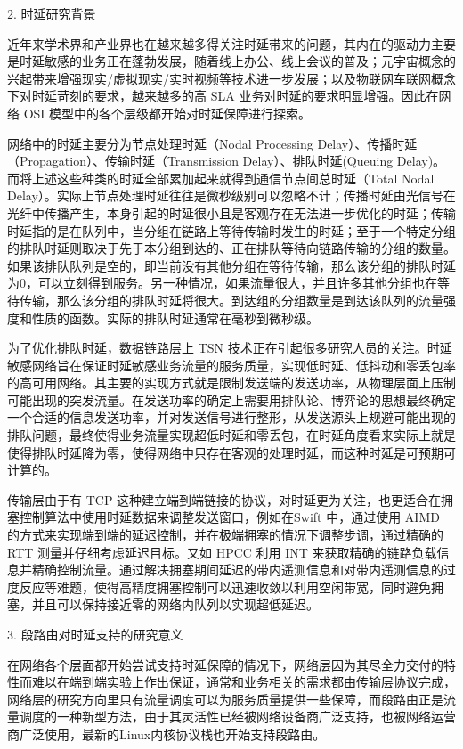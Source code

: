 2. 时延研究背景

近年来学术界和产业界也在越来越多得关注时延带来的问题，其内在的驱动力主要是时延敏感的业务正在蓬勃发展，随着线上办公、线上会议的普及；元宇宙概念的兴起带来增强现实/虚拟现实/实时视频等技术进一步发展；以及物联网车联网概念下对时延苛刻的要求，越来越多的高 \gls*{SLA} 业务对时延的要求明显增强。因此在网络 \gls*{OSI} 模型中的各个层级都开始对时延保障进行探索。

网络中的时延主要分为节点处理时延（Nodal Processing Delay）、传播时延（Propagation）、传输时延（Transmission Delay）、排队时延(Queuing Delay)。而将上述这些种类的时延全部累加起来就得到通信节点间总时延（Total Nodal Delay）。实际上节点处理时延往往是微秒级别可以忽略不计；传播时延由光信号在光纤中传播产生，本身引起的时延很小且是客观存在无法进一步优化的时延；传输时延指的是在队列中，当分组在链路上等待传输时发生的时延；至于一个特定分组的排队时延则取决于先于本分组到达的、正在排队等待向链路传输的分组的数量。如果该排队队列是空的，即当前没有其他分组在等待传输，那么该分组的排队时延为0，可以立刻得到服务。另一种情况，如果流量很大，并且许多其他分组也在等待传输，那么该分组的排队时延将很大。到达组的分组数量是到达该队列的流量强度和性质的函数。实际的排队时延通常在毫秒到微秒级。

为了优化排队时延，数据链路层上 \gls*{TSN} 技术正在引起很多研究人员的关注。时延敏感网络旨在保证时延敏感业务流量的服务质量，实现低时延、低抖动和零丢包率的高可用网络。其主要的实现方式就是限制发送端的发送功率，从物理层面上压制可能出现的突发流量。在发送功率的确定上需要用排队论、博弈论的思想最终确定一个合适的信息发送功率，并对发送信号进行整形，从发送源头上规避可能出现的排队问题，最终使得业务流量实现超低时延和零丢包，在时延角度看来实际上就是使得排队时延降为零，使得网络中只存在客观的处理时延，而这种时延是可预期可计算的。

传输层由于有 \gls*{TCP} 这种建立端到端链接的协议，对时延更为关注，也更适合在拥塞控制算法中使用时延数据来调整发送窗口，例如在Swift \cite{SWIFT} 中，通过使用 \gls*{AIMD} 的方式来实现端到端的延迟控制，并在极端拥塞的情况下调整步调，通过精确的 \gls*{RTT} 测量并仔细考虑延迟目标。又如 \gls*{HPCC} \cite{HPCC} 利用 \gls*{INT} 来获取精确的链路负载信息并精确控制流量。通过解决拥塞期间延迟的带内遥测信息和对带内遥测信息的过度反应等难题，使得高精度拥塞控制可以迅速收敛以利用空闲带宽，同时避免拥塞，并且可以保持接近零的网络内队列以实现超低延迟。

3. 段路由对时延支持的研究意义

在网络各个层面都开始尝试支持时延保障的情况下，网络层因为其尽全力交付的特性而难以在端到端实验上作出保证，通常和业务相关的需求都由传输层协议完成，网络层的研究方向里只有流量调度可以为服务质量提供一些保障，而段路由正是流量调度的一种新型方法，由于其灵活性已经被网络设备商广泛支持，也被网络运营商广泛使用，最新的Linux内核协议栈也开始支持段路由。

